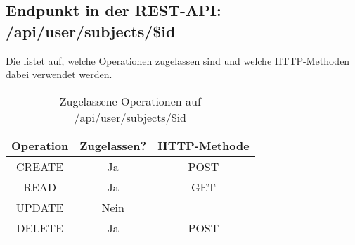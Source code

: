 \subsection{Endpunkt in der REST-API: /api/user/subjects/\$id}
Die  listet auf, welche Operationen zugelassen sind und welche HTTP-Methoden dabei verwendet werden. 

\begin{table}[!htbp]
	\begin{tabular}{|c|c|c|}
		\hline
			\textbf{Operation} & \textbf{Zugelassen?} & \textbf{HTTP-Methode} \\ \hline
			CREATE & Ja & POST \\ \hline 
			READ & Ja & GET \\ \hline
			UPDATE & Nein & \\ \hline 
			DELETE & Ja & POST \\ \hline
	\end{tabular}

		\caption{Zugelassene Operationen auf /api/user/subjects/\$id}
		\label{tab:end:rest:api:user:subjects:id:meth}
\end{table}

